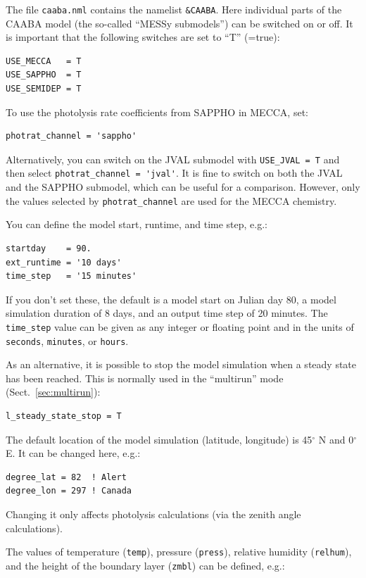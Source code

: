 \documentclass[twoside]{article}
\begin{document}
The file \verb|caaba.nml| contains the namelist \verb|&CAABA|. Here
individual parts of the CAABA model (the so-called ``MESSy submodels'')
can be switched on or off. It is important that the following switches
are set to ``T'' (=true):
\begin{verbatim}
USE_MECCA   = T
USE_SAPPHO  = T
USE_SEMIDEP = T
\end{verbatim}
To use the photolysis rate coefficients from SAPPHO in MECCA, set:
\begin{verbatim}
photrat_channel = 'sappho'
\end{verbatim}
Alternatively, you can switch on the JVAL submodel with
\verb|USE_JVAL = T| and then select \verb|photrat_channel = 'jval'|. It
is fine to switch on both the JVAL and the SAPPHO submodel, which can be
useful for a comparison. However, only the values selected by
\verb|photrat_channel| are used for the MECCA chemistry.

You can define the model start, runtime, and time step, e.g.:
\begin{verbatim}
startday    = 90.
ext_runtime = '10 days'
time_step   = '15 minutes'
\end{verbatim}
If you don't set these, the default is a model start on Julian day 80, a
model simulation duration of 8 days, and an output time step of 20
minutes. The \verb|time_step| value can be given as any integer or
floating point and in the units of \verb|seconds|, \verb|minutes|, or
\verb|hours|.

As an alternative, it is possible to stop the model simulation when a
steady state has been reached. This is normally used in the ``multirun''
mode (Sect.~\ref{sec:multirun}):

\begin{verbatim}
l_steady_state_stop = T
\end{verbatim}

The default location of the model simulation (latitude, longitude) is
45$^\circ$ N and 0$^\circ$ E. It can be changed here, e.g.:

\begin{verbatim}
degree_lat = 82  ! Alert
degree_lon = 297 ! Canada
\end{verbatim}

Changing it only affects photolysis calculations (via the zenith angle
calculations).

The values of temperature (\verb|temp|), pressure (\verb|press|),
relative humidity (\verb|relhum|), and the height of the boundary layer
(\verb|zmbl|) can be defined, e.g.:
\end{document}
